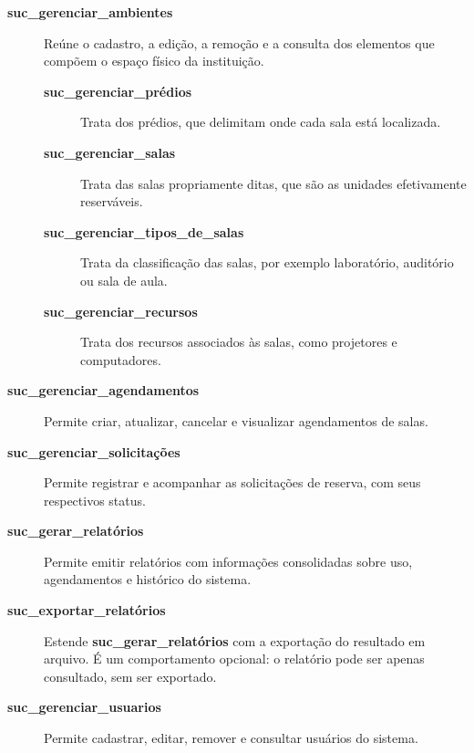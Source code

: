 \begin{description}
    \item[\textbf{suc\_gerenciar\_ambientes}] Reúne o cadastro, a edição, a remoção e a consulta dos elementos que compõem o espaço físico da instituição.

    \begin{description}
        \item[\textbf{suc\_gerenciar\_prédios}] Trata dos prédios, que delimitam onde cada sala está localizada.

        \item[\textbf{suc\_gerenciar\_salas}] Trata das salas propriamente ditas, que são as unidades efetivamente reserváveis.

        \item[\textbf{suc\_gerenciar\_tipos\_de\_salas}] Trata da classificação das salas, por exemplo laboratório, auditório ou sala de aula.

        \item[\textbf{suc\_gerenciar\_recursos}] Trata dos recursos associados às salas, como projetores e computadores.
    \end{description}

    \item[\textbf{suc\_gerenciar\_agendamentos}] Permite criar, atualizar, cancelar e visualizar agendamentos de salas.

    \item[\textbf{suc\_gerenciar\_solicitações}] Permite registrar e acompanhar as solicitações de reserva, com seus respectivos status.

    \item[\textbf{suc\_gerar\_relatórios}] Permite emitir relatórios com informações consolidadas sobre uso, agendamentos e histórico do sistema.

    \item[\textbf{suc\_exportar\_relatórios}] Estende \textbf{suc\_\allowbreak{}gerar\_\allowbreak{}relatórios} com a exportação do resultado em arquivo. É um comportamento opcional: o relatório pode ser apenas consultado, sem ser exportado.

    \item[\textbf{suc\_gerenciar\_usuarios}] Permite cadastrar, editar, remover e consultar usuários do sistema.
\end{description}
